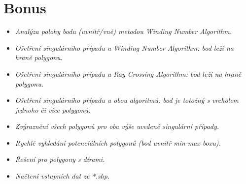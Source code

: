 \section{Bonus}

\begin{itemize}
\item \textit{Analýza polohy bodu (uvnitř/vně) metodou Winding Number Algorithm.}
\item \textit{Ošetření singulárního případu u Winding Number Algorithm: bod leží na hraně polygonu.}
\item \textit{Ošetření singulárního případu u Ray Crossing Algorithm: bod leží na hraně polygonu.}
\item \textit{Ošetření singulárního případu u obou algoritmů: bod je totožný s vrcholem jednoho či více polygonů.}
\item \textit{Zvýraznění všech polygonů pro oba výše uvedené singulární případy.}
\item \textit{Rychlé vyhledání potenciálních polygonů (bod uvnitř min-max boxu).}
\item \textit{Řešení pro polygony s dírami.}
\item \textit{Načtení vstupních dat ze *.shp.}
\end{itemize}